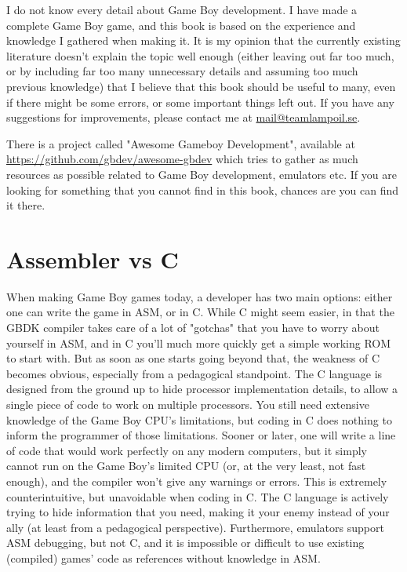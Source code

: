 \documentclass[11pt]{book}
\begin{document}
I do not know every detail about Game Boy development. I have made a complete Game Boy game, and this book is based on the experience and knowledge I gathered when making it. It is my opinion that the currently existing literature doesn't explain the topic well enough (either leaving out far too much, or by including far too many unnecessary details and assuming too much previous knowledge) that I believe that this book should be useful to many, even if there might be some errors, or some important things left out. If you have any suggestions for improvements, please contact me at \url{mail@teamlampoil.se}. 

There is a project called "Awesome Gameboy Development", available at \url{https://github.com/gbdev/awesome-gbdev} which tries to gather as much resources as possible related to Game Boy development, emulators etc. If you are looking for something that you cannot find in this book, chances are you can find it there.

\section{Assembler vs C}
\label{asmvsc}
When making Game Boy games today, a developer has two main options: either one can write the game in ASM, or in C. While C might seem easier, in that the GBDK compiler takes care of a lot of "gotchas" that you have to worry about yourself in ASM, and in C you'll much more quickly get a simple working ROM to start with. But as soon as one starts going beyond that, the weakness of C becomes obvious, especially from a pedagogical standpoint. The C language is designed from the ground up to hide processor implementation details, to allow a single piece of code to work on multiple processors. You still need extensive knowledge of the Game Boy CPU's limitations, but coding in C does nothing to inform the programmer of those limitations. Sooner or later, one will write a line of code that would work perfectly on any modern computers, but it simply cannot run on the Game Boy's limited CPU (or, at the very least, not fast enough), and the compiler won't give any warnings or errors. This is extremely counterintuitive, but unavoidable when coding in C. The C language is actively trying to hide  information that you need, making it your enemy instead of your ally (at least from a pedagogical perspective). Furthermore, emulators support ASM debugging, but not C, and it is impossible or difficult to use existing (compiled) games’ code as references without knowledge in ASM. 
\end{document}
